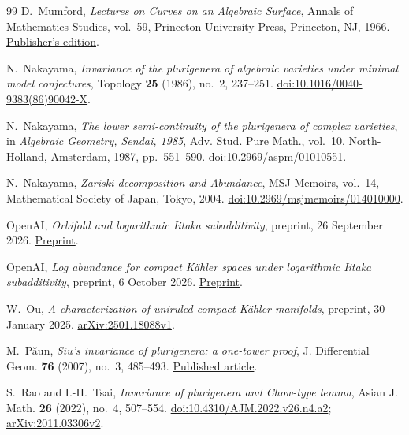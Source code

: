 \documentclass[11pt,a4paper]{article}
\numberwithin{equation}{section}
\theoremstyle{definition}
\theoremstyle{remark}
\begin{document}
\begin{thebibliography}{99}
D.~Mumford,
\emph{Lectures on Curves on an Algebraic Surface},
Annals of Mathematics Studies, vol.~59,
Princeton University Press, Princeton, NJ, 1966.
\href{https://press.princeton.edu/books/paperback/9780691079936/lectures-on-curves-on-an-algebraic-surface}{Publisher's edition}.

N.~Nakayama,
\emph{Invariance of the plurigenera of algebraic varieties under
minimal model conjectures},
Topology \textbf{25} (1986), no.~2, 237--251.
\href{https://doi.org/10.1016/0040-9383(86)90042-X}{doi:10.1016/0040-9383(86)90042-X}.

N.~Nakayama,
\emph{The lower semi-continuity of the plurigenera of complex varieties},
in \emph{Algebraic Geometry, Sendai, 1985},
Adv. Stud. Pure Math., vol.~10,
North-Holland, Amsterdam, 1987, pp.~551--590.
\href{https://doi.org/10.2969/aspm/01010551}{doi:10.2969/aspm/01010551}.

N.~Nakayama,
\emph{Zariski-decomposition and Abundance},
MSJ Memoirs, vol.~14, Mathematical Society of Japan, Tokyo, 2004.
\href{https://doi.org/10.2969/msjmemoirs/014010000}{doi:10.2969/msjmemoirs/014010000}.

OpenAI,
\emph{Orbifold and logarithmic Iitaka subadditivity},
preprint, 26 September 2026.
\href{https://github.com/openai/math/blob/fd4aeeb2ee4fc729c18d98444fed42fd0529eeeb/preprints/Orbifold-and-logarithmic-Iitaka-subadditivity-September-26-2026/paper.pdf}{Preprint}.

OpenAI,
\emph{Log abundance for compact Kähler spaces under logarithmic
Iitaka subadditivity},
preprint, 6 October 2026.
\href{https://github.com/openai/math/blob/fd4aeeb2ee4fc729c18d98444fed42fd0529eeeb/preprints/Log-abundance-for-compact-Kahler-spaces-under-logarithmic-Iitaka-subadditivity-October-6-2026/main.pdf}{Preprint}.

W.~Ou,
\emph{A characterization of uniruled compact Kähler manifolds},
preprint, 30 January 2025.
\href{https://arxiv.org/abs/2501.18088v1}{arXiv:2501.18088v1}.

M.~Păun,
\emph{Siu's invariance of plurigenera: a one-tower proof},
J. Differential Geom. \textbf{76} (2007), no.~3, 485--493.
\href{https://archive.ymsc.tsinghua.edu.cn/pacm_download/21/685-JDG-76-3-485-493.pdf}{Published article}.

S.~Rao and I.-H.~Tsai,
\emph{Invariance of plurigenera and Chow-type lemma},
Asian J. Math. \textbf{26} (2022), no.~4, 507--554.
\href{https://doi.org/10.4310/AJM.2022.v26.n4.a2}{doi:10.4310/AJM.2022.v26.n4.a2};
\href{https://arxiv.org/abs/2011.03306v2}{arXiv:2011.03306v2}.


\end{thebibliography}
\end{document}
